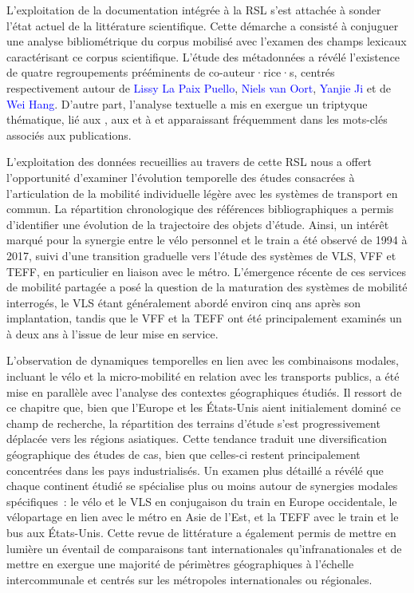 \begin{refsegment}
L'exploitation de la documentation intégrée à la \acrshort{RSL} s'est attachée à sonder l'état actuel de la littérature scientifique. Cette démarche a consisté à conjuguer une analyse bibliométrique du corpus mobilisé avec l'examen des champs lexicaux caractérisant ce corpus scientifique. L'étude des métadonnées a révélé l'existence de quatre regroupements prééminents de co-auteur·rice·s, centrés respectivement autour de \textcolor{blue}{Lissy La Paix Puello}, \textcolor{blue}{Niels van Oort}, \textcolor{blue}{Yanjie Ji} et de \textcolor{blue}{Wei Hang}. D'autre part, l'analyse textuelle a mis en exergue un triptyque thématique, lié aux , aux  et à  et apparaissant fréquemment dans les mots-clés associés aux publications.%

L'exploitation des données recueillies au travers de cette \acrshort{RSL} nous a offert l'opportunité d'examiner l'évolution temporelle des études consacrées à l'articulation de la mobilité individuelle légère avec les systèmes de transport en commun. La répartition chronologique des références bibliographiques a permis d'identifier une évolution de la trajectoire des objets d'étude. Ainsi, un intérêt marqué pour la synergie entre le vélo personnel et le train a été observé de 1994 à 2017, suivi d'une transition graduelle vers l'étude des systèmes de \acrshort{VLS}, \acrshort{VFF} et \acrshort{TEFF}, en particulier en liaison avec le métro. L'émergence récente de ces services de mobilité partagée a posé la question de la maturation des systèmes de mobilité interrogés, le \acrshort{VLS} étant généralement abordé environ cinq ans après son implantation, tandis que le \acrshort{VFF} et la \acrshort{TEFF} ont été principalement examinés un à deux ans à l'issue de leur mise en service.%

L'observation de dynamiques temporelles en lien avec les combinaisons modales, incluant le vélo et la micro-mobilité en relation avec les transports publics, a été mise en parallèle avec l'analyse des contextes géographiques étudiés. Il ressort de ce chapitre que, bien que l'Europe et les États-Unis aient initialement dominé ce champ de recherche, la répartition des terrains d'étude s'est progressivement déplacée vers les régions asiatiques. Cette tendance traduit une diversification géographique des études de cas, bien que celles-ci restent principalement concentrées dans les pays industrialisés. Un examen plus détaillé a révélé que chaque continent étudié se spécialise plus ou moins autour de synergies modales spécifiques~: le vélo et le \acrshort{VLS} en conjugaison du train en Europe occidentale, le vélopartage en lien avec le métro en Asie de l'Est, et la \acrshort{TEFF} avec le train et le bus aux États-Unis. Cette revue de littérature a également permis de mettre en lumière un éventail de comparaisons tant internationales qu'infranationales et de mettre en exergue une majorité de périmètres géographiques à l'échelle intercommunale et centrés sur les métropoles internationales ou régionales.%


\end{refsegment}
